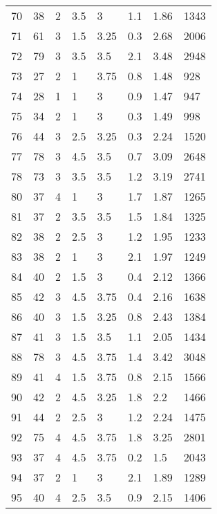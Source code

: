 \begin{table*}[h!]
\begin{tabular*}{\linewidth}{p{40pt}<{\centering}p{30pt}<{\centering}
    p{30pt}<{\centering}p{40pt}<{\centering}p{50pt}<{\centering}p{70pt}<{\centering}
    p{60pt}<{\centering}p{50pt}<{\centering}}
    70 & 38 & 2 & 3.5 & 3 & 1.1 & 1.86 & 1343 \\
    71 & 61 & 3 & 1.5 & 3.25 & 0.3 & 2.68 & 2006 \\
    72 & 79 & 3 & 3.5 & 3.5 & 2.1 & 3.48 & 2948 \\
    73 & 27 & 2 & 1 & 3.75 & 0.8 & 1.48 & 928 \\
    74 & 28 & 1 & 1 & 3 & 0.9 & 1.47 & 947 \\
    75 & 34 & 2 & 1 & 3 & 0.3 & 1.49 & 998 \\
    76 & 44 & 3 & 2.5 & 3.25 & 0.3 & 2.24 & 1520 \\
    77 & 78 & 3 & 4.5 & 3.5 & 0.7 & 3.09 & 2648 \\
    78 & 73 & 3 & 3.5 & 3.5 & 1.2 & 3.19 & 2741 \\
    80 & 37 & 4 & 1 & 3 & 1.7 & 1.87 & 1265 \\
    81 & 37 & 2 & 3.5 & 3.5 & 1.5 & 1.84 & 1325 \\
    82 & 38 & 2 & 2.5 & 3 & 1.2 & 1.95 & 1233 \\
    83 & 38 & 2 & 1 & 3 & 2.1 & 1.97 & 1249 \\
    84 & 40 & 2 & 1.5 & 3 & 0.4 & 2.12 & 1366 \\
    85 & 42 & 3 & 4.5 & 3.75 & 0.4 & 2.16 & 1638 \\
    86 & 40 & 3 & 1.5 & 3.25 & 0.8 & 2.43 & 1384 \\
    87 & 41 & 3 & 1.5 & 3.5 & 1.1 & 2.05 & 1434 \\
    88 & 78 & 3 & 4.5 & 3.75 & 1.4 & 3.42 & 3048 \\
    89 & 41 & 4 & 1.5 & 3.75 & 0.8 & 2.15 & 1566 \\
    90 & 42 & 2 & 4.5 & 3.25 & 1.8 & 2.2 & 1466 \\
    91 & 44 & 2 & 2.5 & 3 & 1.2 & 2.24 & 1475 \\
    92 & 75 & 4 & 4.5 & 3.75 & 1.8 & 3.25 & 2801 \\
    93 & 37 & 4 & 4.5 & 3.75 & 0.2 & 1.5 & 2043 \\
    94 & 37 & 2 & 1 & 3 & 2.1 & 1.89 & 1289 \\
    95 & 40 & 4 & 2.5 & 3.5 & 0.9 & 2.15 & 1406 \\
    \bottomrule
  \end{tabular*}
  \label{Ap2}
\end{table*}



